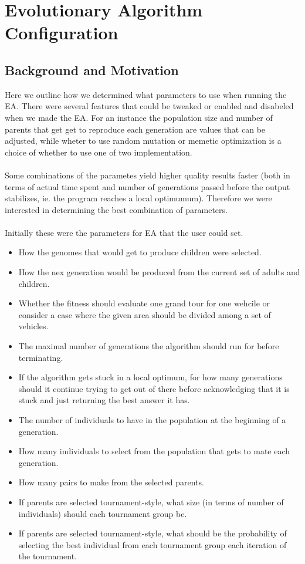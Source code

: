 \chapter{Evolutionary Algorithm Configuration} %
\label{cha:evolutionary_algorithm_configuration}

\section{Background and Motivation} %
\label{sec:background_and_motivation}
Here we outline how we determined what parameters to use when running the EA. There were several features that could be tweaked or enabled and disabeled when we made the EA. For an instance the population size and number of parents that get get to reproduce each generation are values that can be adjusted, while wheter to use random mutation or memetic optimization is a choice of whether to use one of two implementation.
\\\\
Some combinations of the parametes yield higher quality results faster (both in terms of actual time spent and number of generations passed before the output stabilizes, ie. the program reaches a local optimumum). Therefore we were interested in determining the best combination of parameters.
\\\\
Initially these were the parameters for EA that the user could set.
\begin{itemize}
	\item How the genomes that would get to produce children were selected.
	\item How the nex generation would be produced from the current set of adults and children.
	\item Whether the fitness should evaluate one grand tour for one wehcile or consider a case where the given area should be divided among a set of vehicles.
	\item The maximal number of generations the algorithm should run for before terminating.
	\item If the algorithm gets stuck in a local optimum, for how many generations should it continue trying to get out of there before acknowledging that it is stuck and just returning the best answer it has.
	\item The number of individuals to have in the population at the beginning of a generation.
	\item How many individuals to select from the population that gets to mate each generation.
	\item How many pairs to make from the selected parents.
	\item If parents are selected tournament-style, what size (in terms of number of individuals) should each tournament group be.
	\item If parents are selected tournament-style, what should be the probability of selecting the best individual from each tournament group each iteration of the tournament.

\end{itemize}

